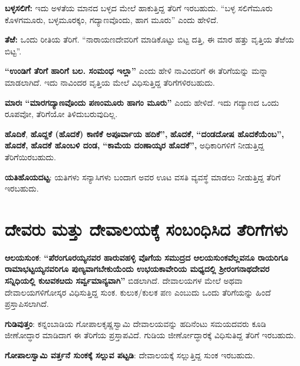 \textbf{ಬಳ್ಳಸಲಿಗೆ:} ಇದು ಅಳತೆಯ ಮಾನದ ಬಳ್ಳದ ಮೇಲೆ ಹಾಕುತ್ತಿದ್ದ ತೆರಿಗೆ ಇರಬಹುದು. “ಬಳ್ಳ ಸಲಿಗೆಮೂರು ಕೊಳಗಮೂರು, ಬಳ್ಳಮೂರಕ್ಕಂ, ಗದ್ಯಾಣವೊಂದು, ಹಾಗ ಮೂರು” ಎಂದು ಹೇಳಿದೆ.

\textbf{ತೆಱೆ: } ಒಂದು ರೀತಿಯ ತೆರಿಗೆ. “ನಾರಾಯಣದೇವರಿಗೆ ಮಾಡಿಕೊಟ್ಟು ಬಿಟ್ಟ ದತ್ತಿ, ಈ ಮಾರ ಹತ್ತು ವೃತ್ತಿಯ ತೆಱೆಯ ಬಿಟ್ಟ”.

\textbf{“ಉಂಡಿಗೆ ತೆರಿಗೆ ಹಾರಿಗೆ ಬಲ. ಸಂಮಂಧ ಇಲ್ಲಾ”} ಎಂದು ಹೇಳಿ\textbf{ }ನಾವಿಂದರಿಗೆ ಈ ತೆರಿಗೆಯನ್ನು ಮನ್ನಾ ಮಾಡಲಾಗಿದೆ. ಇದು ನಾವಿಂದರ ವೃತ್ತಿಯ ಮೇಲೆ ವಿಧಿಸುತ್ತಿದ್ದ ತೆರಿಗೆಗಳಿರಬಹುದು. 

\textbf{ಮಾರಃ “ಮಾರಗದ್ಯಾಣವೊಂದು ಪಣಂಮೂರು ಹಾಗಂ ಮೂರು”} ಎಂದು ಹೇಳಿದೆ. ಇದು ಗದ್ಯಾಣದ ಒಂದು ರೂಪವೋ, ತೆರಿಗೆಯೋ ತಿಳಿದುಬರುವುದಿಲ್ಲ.

\textbf{ಹೊದಿಕೆ},\textbf{ ಹೊದ್ದಕೆ (ಹೊದಕೆ) ಕಾಣಿಕೆ ಅಪೂರ್ವಾಯ ಹದಿಕೆ”,}\textbf{ ಹೊದಕೆ,}\textbf{ “ದಂಡದೋಷ\general{\break } ಹೊದಕೆಯೆಂಬ”,}\textbf{ ಹೊದಕೆ,}\textbf{ ಹೊದಕೆ ಹೊಂಬಳಿ ದಂಡ,}\textbf{ “ಕಾಮೆಯ ದಂಣಾಯ್ಕರ ಹೊದಕೆ”,} ಅಧಿಕಾರಿಗಳಿಗೆ ನೀಡುತ್ತಿದ್ದ ತೆರಿಗೆಯಿರಬಹುದು.

\textbf{ಯತಿಹೊಯದಟ್ಟ}: ಯತಿಗಳು ಸನ್ಯಾಸಿಗಳು ಬಂದಾಗ ಅವರ ಊಟ ವಸತಿ ವ್ಯವಸ್ಥೆ ಮಾಡಲು ನೀಡುತ್ತಿದ್ದ ತೆರಿಗೆ ಇರಬಹುದು.


\section{ದೇವರು ಮತ್ತು ದೇವಾಲಯಕ್ಕೆ ಸಂಬಂಧಿಸಿದ ತೆರಿಗೆಗಳು}

\textbf{ಆಲಯಸುಂಕ}: \textbf{“ಪೆರಂಗೂರಯ್ಯನವರ ಹಾರುವಹಳ್ಳಿ ವೊಗೆಯ ಸಮುದ್ರದ ಆಲಯಸುಂಕವೆಲ್ಲವನೂ ರಾಯರಿಗೂ ರಾಮಾಭಟ್ಟಯ್ಯನವರಿಗೂ ಪುಣ್ಯವಾಗಬೇಕುಯೆಂದು ಉಭಯಕಾವೇರಿಯ ಮಧ್ಯದಲ್ಲಿ ಶ‍್ರೀರಂಗನಾಥದೇವರ ಸನ್ನಿಧಿಯಲ್ಲಿ ಕುೞವಕೞದು ಸರ್ವ್ವಮಾನ್ಯವಾಗಿ”} ಬಿಡಲಾಗಿದೆ. ದೇವಾಲಯಗಳ ಮೇಲೆ ಅಥವಾ ದೇವಾಲಯಗಳಿಗೋಸ್ಕರ ವಿಧಿಸುತ್ತಿದ್ದ ಸುಂಕ. ಕುಲುಕ/ಕುಲಕ ಪಣ ಎಂಬುದು ಒಂದು ತೆರಿಗೆಯನ್ನು ಹಿಂದೆ ಪ್ರಸ್ತಾಪಿಸಲಾಗಿದೆ. 

\textbf{ಗುಡಿವುತ್ತಂ}: ಕನ್ನಂಬಾಡಿಯ ಗೋಪಾಲಕೃಷ್ಣಸ್ವಾಮಿ ದೇವಾಲಯವನ್ನು ಹದಿನೆಂಟು ಸಮಯದವರು ಕೂಡಿ ಜೀಣೋದ್ಧಾರ ಮಾಡಿದಾಗ ಈ ತೆರಿಗೆಯ ಪ್ರಸ್ತಾಪವಿದೆ. ಗುಡಿಯ ಜೀರ್ಣೋದ್ಧಾರಕ್ಕೆ ವಿಧಿಸುತಿದ್ದ ತೆರಿಗೆ ಇರಬಹುದು.

\textbf{ಗೋಪಾಲಸ್ವಾಮಿ ವರ್ತ್ತನೆ ಸುಂಕಕ್ಕೆ ಸಲ್ಲುವ ಪಟ್ಟಡಿ}: ದೇವಾಲಯಕ್ಕೆ ಸಲ್ಲುತ್ತಿದ್ದ ಸುಂಕ ಇರಬಹುದು.

